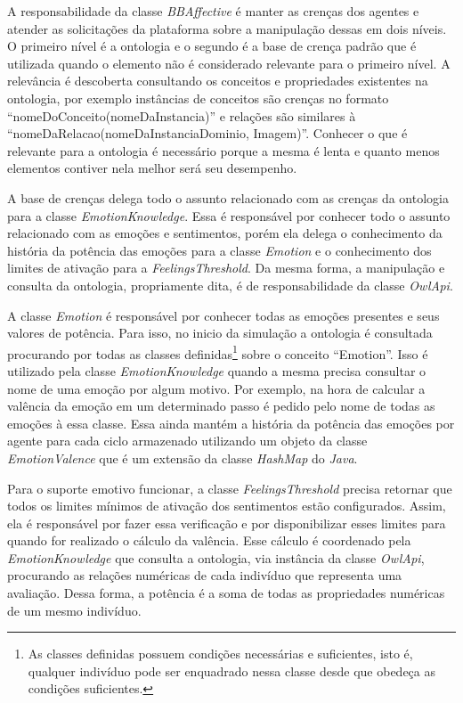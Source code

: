 A responsabilidade da classe \emph{BBAffective} é manter as crenças dos
agentes e atender as solicitações da plataforma \jason sobre a manipulação
dessas em dois níveis. O primeiro nível é a ontologia e o segundo é a base de
crença padrão que é utilizada quando o elemento não é considerado relevante
para o primeiro nível. A relevância é descoberta consultando os conceitos e
propriedades existentes na ontologia, por exemplo instâncias de conceitos são
crenças no formato ``nomeDoConceito(nomeDaInstancia)'' e relações são
similares à ``nomeDaRelacao(nomeDaInstanciaDominio, Imagem)''. Conhecer o que
é relevante para a ontologia é necessário porque a mesma é lenta e quanto
menos elementos contiver nela melhor será seu desempenho.

A base de crenças delega todo o assunto relacionado com as crenças da
ontologia para a classe \emph{EmotionKnowledge}. Essa é responsável por
conhecer todo o assunto relacionado com as emoções e sentimentos, porém ela
delega o conhecimento da história da potência das emoções para a classe
\emph{Emotion} e o conhecimento dos limites de ativação para a
\emph{FeelingsThreshold}. Da mesma forma, a manipulação e consulta da
ontologia, propriamente dita, é de responsabilidade da classe \emph{OwlApi}.

A classe \emph{Emotion} é responsável por conhecer todas as emoções presentes
e seus valores de potência. Para isso, no inicio da simulação a ontologia é
consultada procurando por todas as classes definidas\footnote{As classes
definidas possuem condições necessárias e suficientes, isto é, qualquer
indivíduo pode ser enquadrado nessa classe desde que obedeça as condições
suficientes.} sobre o conceito ``Emotion''. Isso é utilizado pela classe
\emph{EmotionKnowledge} quando a mesma precisa consultar o nome de uma emoção
por algum motivo. Por exemplo, na hora de calcular a valência da emoção em um
determinado passo é pedido pelo nome de todas as emoções à essa classe. Essa
ainda mantém a história da potência das emoções por agente para cada ciclo
armazenado utilizando um objeto da classe \emph{EmotionValence} que é um
extensão da classe \emph{HashMap} do \emph{Java}.

Para o suporte emotivo funcionar, a classe \emph{FeelingsThreshold} precisa
retornar que todos os limites mínimos de ativação dos sentimentos estão configurados.
Assim, ela é responsável por fazer essa verificação e por disponibilizar esses
limites para quando for realizado o cálculo da valência. Esse cálculo é
coordenado pela \emph{EmotionKnowledge} que consulta a ontologia, via instância
da classe \emph{OwlApi}, procurando as relações numéricas de cada indivíduo
que representa uma avaliação. Dessa forma, a potência é a soma de todas as
propriedades numéricas de um mesmo indivíduo.


